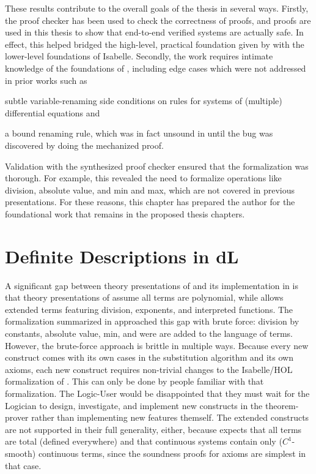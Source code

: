 \documentclass[12pt]{cmuthesis}
\theoremstyle{definition}
\theoremstyle{remark}
\newcommand{\rref}[2][]{\prettyref{#2}}
\begin{document}
These results contribute to the overall goals of the thesis in several ways.
Firstly, the proof checker has been used to check the correctness of \dL proofs, and \dL proofs are used in this thesis to show that end-to-end verified systems are actually safe.
In effect, this helped bridged the high-level, practical foundation given by \dL with the lower-level foundations of Isabelle.
Secondly, the work requires intimate knowledge of the foundations of \dL, including edge cases which were not addressed in prior works such as
\begin{inparaenum}[i)]
\item subtle variable-renaming side conditions on rules for systems of (multiple) differential equations and
\item a bound renaming rule, which was in fact unsound in \KeYmaeraX until the bug was discovered by doing the mechanized proof.
\end{inparaenum}
Validation with the synthesized proof checker ensured that the formalization was thorough.
For example, this revealed the need to formalize operations like division, absolute value, and min and max, which are not covered in previous presentations.
For these reasons, this chapter has prepared the author for the foundational work that remains in the proposed thesis chapters.

\section{Definite Descriptions in dL}
\label{sec:definite-description}
A significant gap between theory presentations of \dL and its implementation in \KeYmaeraX is that theory presentations of \dL assume all terms are polynomial, while \KeYmaeraX allows extended terms featuring division, exponents, and interpreted functions.
The formalization summarized in \rref{sec:isabelle-fml} approached this gap with brute force: division by constants, absolute value, min, and were are added to the language of terms.
However, the brute-force approach is brittle in multiple ways.
Because every new construct comes with its own cases in the substitution algorithm and its own axioms, each new construct requires non-trivial changes to the Isabelle/HOL formalization of \dL.
This can only be done by people familiar with that formalization.
The Logic-User would be disappointed that they must wait for the Logician to design, investigate, and implement new constructs in the theorem-prover rather than implementing new features themself.
The extended constructs are not supported in their full generality, either, because \dL expects that all terms are total (defined everywhere) and that continuous systems contain only ($C^1$-smooth) continuous terms, since the soundness proofs for \dL axioms are simplest in that case.
\end{document}
